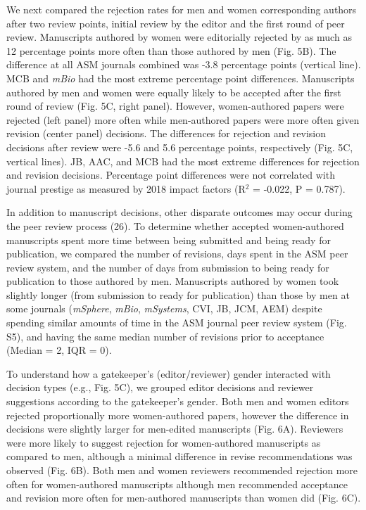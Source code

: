 \documentclass[11pt,]{article}
\begin{document}
We next compared the rejection rates for men and women corresponding
authors after two review points, initial review by the editor and the
first round of peer review. Manuscripts authored by women were
editorially rejected by as much as 12 percentage points more often than
those authored by men (Fig. 5B). The difference at all ASM journals
combined was -3.8 percentage points (vertical line). MCB and \emph{mBio}
had the most extreme percentage point differences. Manuscripts authored
by men and women were equally likely to be accepted after the first
round of review (Fig. 5C, right panel). However, women-authored papers
were rejected (left panel) more often while men-authored papers were
more often given revision (center panel) decisions. The differences for
rejection and revision decisions after review were -5.6 and 5.6
percentage points, respectively (Fig. 5C, vertical lines). JB, AAC, and
MCB had the most extreme differences for rejection and revision
decisions. Percentage point differences were not correlated with journal
prestige as measured by 2018 impact factors (R\({^2}\) = -0.022, P =
0.787).

In addition to manuscript decisions, other disparate outcomes may occur
during the peer review process (26). To determine whether accepted
women-authored manuscripts spent more time between being submitted and
being ready for publication, we compared the number of revisions, days
spent in the ASM peer review system, and the number of days from
submission to being ready for publication to those authored by men.
Manuscripts authored by women took slightly longer (from submission to
ready for publication) than those by men at some journals
(\emph{mSphere}, \emph{mBio}, \emph{mSystems}, CVI, JB, JCM, AEM)
despite spending similar amounts of time in the ASM journal peer review
system (Fig. S5), and having the same median number of revisions prior
to acceptance (Median = 2, IQR = 0).

To understand how a gatekeeper's (editor/reviewer) gender interacted
with decision types (e.g., Fig. 5C), we grouped editor decisions and
reviewer suggestions according to the gatekeeper's gender. Both men and
women editors rejected proportionally more women-authored papers,
however the difference in decisions were slightly larger for men-edited
manuscripts (Fig. 6A). Reviewers were more likely to suggest rejection
for women-authored manuscripts as compared to men, although a minimal
difference in revise recommendations was observed (Fig. 6B). Both men
and women reviewers recommended rejection more often for women-authored
manuscripts although men recommended acceptance and revision more often
for men-authored manuscripts than women did (Fig. 6C).
\end{document}

